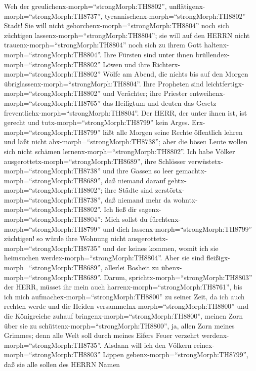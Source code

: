 Weh der greulichenx-morph=``strongMorph:TH8802'',
unflätigenx-morph=``strongMorph:TH8737'',
tyrannischenx-morph=``strongMorph:TH8802'' Stadt!  Sie will
nicht gehorchenx-morph=``strongMorph:TH8804'' noch sich züchtigen
lassenx-morph=``strongMorph:TH8804''; sie will auf den HERRN nicht
trauenx-morph=``strongMorph:TH8804'' noch sich zu ihrem Gott
haltenx-morph=``strongMorph:TH8804''.  Ihre Fürsten sind
unter ihnen brüllendex-morph=``strongMorph:TH8802'' Löwen und ihre
Richterx-morph=``strongMorph:TH8802'' Wölfe am Abend, die nichts bis auf
den Morgen übriglassenx-morph=``strongMorph:TH8804''.  Ihre
Propheten sind leichtfertigx-morph=``strongMorph:TH8802'' und Verächter;
ihre Priester entweihenx-morph=``strongMorph:TH8765'' das Heiligtum und
deuten das Gesetz freventlichx-morph=``strongMorph:TH8804''.
 Der HERR, der unter ihnen ist, ist gerecht und
tutx-morph=``strongMorph:TH8799'' kein Arges.
Erx-morph=``strongMorph:TH8799'' läßt alle Morgen seine Rechte
öffentlich lehren und läßt nicht abx-morph=``strongMorph:TH8738''; aber
die bösen Leute wollen sich nicht schämen
lernenx-morph=``strongMorph:TH8802''.  Ich habe Völker
ausgerottetx-morph=``strongMorph:TH8689'', ihre Schlösser
verwüstetx-morph=``strongMorph:TH8738'' und ihre Gassen so leer
gemachtx-morph=``strongMorph:TH8689'', daß niemand darauf
gehtx-morph=``strongMorph:TH8802''; ihre Städte sind
zerstörtx-morph=``strongMorph:TH8738'', daß niemand mehr da
wohntx-morph=``strongMorph:TH8802''.  Ich ließ dir
sagenx-morph=``strongMorph:TH8804'': Mich sollst du
fürchtenx-morph=``strongMorph:TH8799'' und dich
lassenx-morph=``strongMorph:TH8799'' züchtigen! so würde ihre Wohnung
nicht ausgerottetx-morph=``strongMorph:TH8735'' und der keines kommen,
womit ich sie heimsuchen werdex-morph=``strongMorph:TH8804''. Aber sie
sind fleißigx-morph=``strongMorph:TH8689'', allerlei Bosheit zu
übenx-morph=``strongMorph:TH8689''.  Darum,
sprichtx-morph=``strongMorph:TH8803'' der HERR, müsset ihr mein auch
harrenx-morph=``strongMorph:TH8761'', bis ich mich
aufmachex-morph=``strongMorph:TH8800'' zu seiner Zeit, da ich auch
rechten werde und die Heiden versammelnx-morph=``strongMorph:TH8800''
und die Königreiche zuhauf bringenx-morph=``strongMorph:TH8800'', meinen
Zorn über sie zu schüttenx-morph=``strongMorph:TH8800'', ja, allen Zorn
meines Grimmes; denn alle Welt soll durch meines Eifers Feuer verzehrt
werdenx-morph=``strongMorph:TH8735''.  Alsdann will ich den
Völkern reinex-morph=``strongMorph:TH8803'' Lippen
gebenx-morph=``strongMorph:TH8799'', daß sie alle sollen des HERRN Namen

